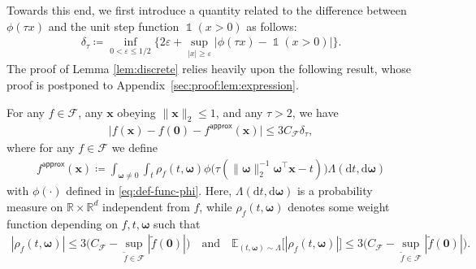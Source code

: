 \documentclass[english]{article}
\DeclareMathOperator{\ind}{\mathds{1}}  %
\begin{document}
Towards this end, we first introduce a quantity related to the difference between $\phi(\tau x)$ and the unit step function $\ind(x > 0)$ as follows: 
%
\begin{align}
\delta_{\tau} \coloneqq \inf_{0 < \varepsilon \le 1/2} \Big\{2\varepsilon + \sup_{|x| \ge \varepsilon} \big|\phi(\tau x) - \ind(x > 0) \big|\Big\}.
\label{eq:defn-delta-tau}
\end{align}
%
The proof of Lemma \ref{lem:discrete} relies heavily upon the following result, whose proof is postponed to Appendix~\ref{sec:proof:lem:expression}.
%
\begin{lemma} \label{lem:expression}
For any $f \in \mathcal{F}$, any $\bm{x}$ obeying $\|\bm{x}\|_2\le 1$, and any $\tau > 2$, we have 
\begin{align}
\big|f({\bm x}) - f(\bm{0}) - f^{\mathsf{approx}}({\bm x}) \big| \le 3C_{\mathcal{F}}\delta_{\tau}, 
\label{eq:expression}
\end{align}
%
where for any $f\in \mathcal{F}$ we define
%
\begin{align}
f^{\mathsf{approx}}({\bm x})
\coloneqq \int_{{\bm \omega}\ne 0}\int_t \rho_f(t, {\bm \omega})\phi\big(\tau(\|{\bm \omega}\|_2^{-1}{\bm \omega}^{\top}{\bm x} - t)\big)\Lambda(\mathrm{d}t, \mathrm{d}{\bm \omega})
\label{eq:f-approx-x}
\end{align}
%
with $\phi(\cdot)$ defined in \eqref{eq:def-func-phi}. 
Here, $\Lambda(\mathrm{d}t, \mathrm{d}\bm{\omega})$ is a probability measure on $\mathbb{R}\times\mathbb{R}^d$ independent from $f$, while $\rho_f(t, \bm{\omega})$ denotes some weight function depending on $f, t, \bm{\omega}$ such that 
%
\begin{align}
\label{eq:rho-UB-lemma}
|\rho_f(t, \bm{\omega})| \le 3\Big(C_{\mathcal{F}} - \sup_{\tilde{f}\in\mathcal{F}}|\tilde{f}(\bm{0})|\Big)
\quad\text{and}\quad
\mathbb{E}_{(t, \bm{\omega}) \sim \Lambda}\big[|\rho_f(t, \bm{\omega})|\big] \le 3\Big(C_{\mathcal{F}} - \sup_{\tilde{f}\in\mathcal{F}}|\tilde{f}(\bm{0})|\Big).
\end{align}
\end{lemma}
\end{document}

